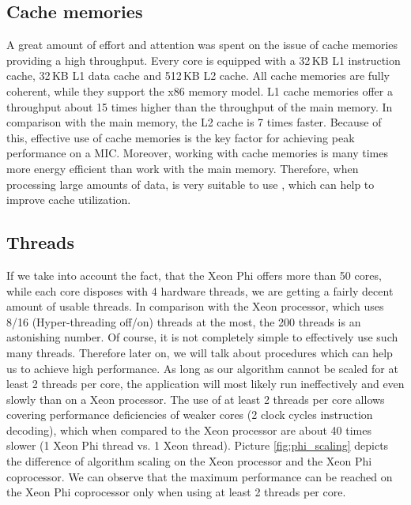 \subsection{Cache memories}
A great amount of effort and attention was spent on the issue of cache memories providing a high throughput. Every core is equipped with a 32\,KB L1 instruction cache, 32\,KB L1 data cache and 512\,KB L2 cache. All cache memories are fully coherent, while they support the x86 memory model. L1 cache memories offer a throughput about 15 times higher than the throughput of the main memory. In comparison with the main memory, the L2 cache is 7 times faster. Because of this, effective use of cache memories is the key factor for achieving peak performance on a MIC. Moreover, working with cache memories is many times more energy efficient than work with the main memory. Therefore, when processing large amounts of data, is very suitable to use , which can help to improve cache utilization.

\subsection{Threads}
If we take into account the fact, that the Xeon Phi offers more than 50 cores, while each core disposes with 4 hardware threads, we are getting a fairly decent amount of usable threads. In comparison with the Xeon processor, which uses 8/16 (Hyper-threading off/on) threads at the most, the 200 threads is an astonishing number. Of course, it is not completely simple to effectively use such many threads. Therefore later on, we will talk about procedures which can help us to achieve high performance. As long as our algorithm cannot be scaled for at least 2 threads per core, the application will most likely run ineffectively and even slowly than on a Xeon processor. The use of at least 2 threads per core allows covering performance deficiencies of weaker cores (2 clock cycles instruction decoding), which when compared to the Xeon processor are about 40 times slower (1 Xeon Phi thread vs. 1 Xeon thread). Picture \ref{fig:phi_scaling} depicts the difference of algorithm scaling on the Xeon processor and the Xeon Phi coprocessor. We can observe that the maximum performance can be reached on the Xeon Phi coprocessor only when using at least 2 threads per core. 


